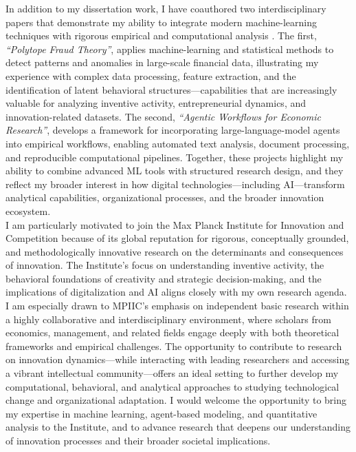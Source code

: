 \documentclass{nfr}
\begin{document}
In addition to my dissertation work, I have coauthored two interdisciplinary papers that demonstrate my ability to integrate modern machine-learning techniques with rigorous empirical and computational analysis \citep{Zhao2025, Dawid2025}. 
The first, \textit{“Polytope Fraud Theory”}, applies machine-learning and statistical methods to detect patterns and anomalies in large-scale financial data, illustrating my experience with complex data processing, feature extraction, and the identification of latent behavioral structures—capabilities that are increasingly valuable for analyzing inventive activity, entrepreneurial dynamics, and innovation-related datasets. 
The second, \textit{“Agentic Workflows for Economic Research”}, develops a framework for incorporating large-language-model agents into empirical workflows, enabling automated text analysis, document processing, and reproducible computational pipelines. 
Together, these projects highlight my ability to combine advanced ML tools with structured research design, and they reflect my broader interest in how digital technologies—including AI—transform analytical capabilities, organizational processes, and the broader innovation ecosystem.\\

I am particularly motivated to join the Max Planck Institute for Innovation and Competition because of its global reputation for rigorous, conceptually grounded, and methodologically innovative research on the determinants and consequences of innovation. 
The Institute’s focus on understanding inventive activity, the behavioral foundations of creativity and strategic decision-making, and the implications of digitalization and AI aligns closely with my own research agenda. 
I am especially drawn to MPIIC’s emphasis on independent basic research within a highly collaborative and interdisciplinary environment, where scholars from economics, management, and related fields engage deeply with both theoretical frameworks and empirical challenges. 
The opportunity to contribute to research on innovation dynamics—while interacting with leading researchers and accessing a vibrant intellectual community—offers an ideal setting to further develop my computational, behavioral, and analytical approaches to studying technological change and organizational adaptation. 
I would welcome the opportunity to bring my expertise in machine learning, agent-based modeling, and quantitative analysis to the Institute, and to advance research that deepens our understanding of innovation processes and their broader societal implications.\\
\end{document}

